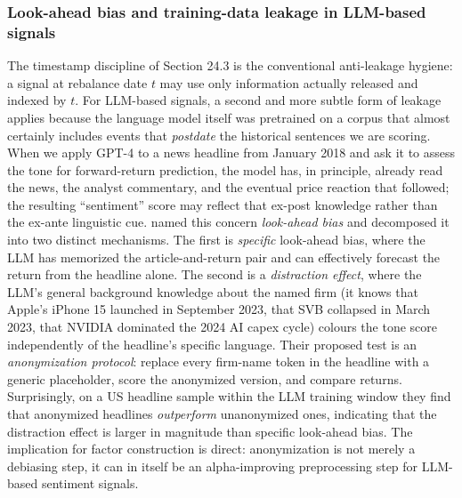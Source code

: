 \subsubsection{Look-ahead bias and training-data leakage in LLM-based signals}

The timestamp discipline of Section 24.3 is the conventional anti-leakage hygiene: a signal at rebalance date $t$ may use only information actually released and indexed by $t$. For LLM-based signals, a second and more subtle form of leakage applies because the language model itself was pretrained on a corpus that almost certainly includes events that \textit{postdate} the historical sentences we are scoring. When we apply GPT-4 to a news headline from January 2018 and ask it to assess the tone for forward-return prediction, the model has, in principle, already read the news, the analyst commentary, and the eventual price reaction that followed; the resulting ``sentiment'' score may reflect that ex-post knowledge rather than the ex-ante linguistic cue. \cite{glasserman2023lookahead} named this concern \textit{look-ahead bias} and decomposed it into two distinct mechanisms. The first is \textit{specific} look-ahead bias, where the LLM has memorized the article-and-return pair and can effectively forecast the return from the headline alone. The second is a \textit{distraction effect}, where the LLM's general background knowledge about the named firm (it knows that Apple's iPhone 15 launched in September 2023, that SVB collapsed in March 2023, that NVIDIA dominated the 2024 AI capex cycle) colours the tone score independently of the headline's specific language. Their proposed test is an \textit{anonymization protocol}: replace every firm-name token in the headline with a generic placeholder, score the anonymized version, and compare returns. Surprisingly, on a US headline sample within the LLM training window they find that anonymized headlines \textit{outperform} unanonymized ones, indicating that the distraction effect is larger in magnitude than specific look-ahead bias. The implication for factor construction is direct: anonymization is not merely a debiasing step, it can in itself be an alpha-improving preprocessing step for LLM-based sentiment signals.

